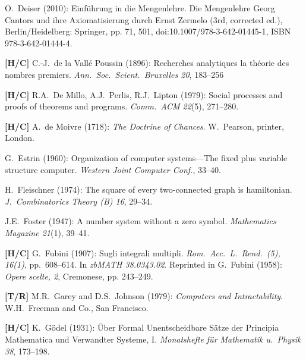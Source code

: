 \begin{thebibliography}{999}
O.~Deiser (2010): Einf\"{u}hrung in die Mengenlehre.  Die Mengenlehre Georg Cantors und ihre Axiomatisierung durch Ernst Zermelo (3rd, corrected ed.), Berlin/Heidelberg: Springer, pp. 71, 501, doi:10.1007/978-3-642-01445-1, ISBN 978-3-642-01444-4.

{\bf [H/C]}
C.-J.~de la Vall\'{e} Poussin (1896): Recherches analytiques la th\'{e}orie des nombres premiers.
{\it Ann.~Soc.~Scient.~Bruxelles 20}, 183--256

{\bf [H/C]}
R.A.~De Millo, A.J.~Perlis, R.J.~Lipton (1979): Social processes and proofs of theorems and programs.  {\it Comm.~ACM 22}(5), 271--280.

{\bf [H/C]}
A.~de Moivre (1718): {\it The Doctrine of Chances}.  W.~Pearson, printer, London.



G.~Estrin (1960): Organization of computer systems---The fixed plus variable structure computer.
{\it Western Joint Computer Conf.}, 33--40.




H.~Fleischner (1974):  The square of every two-connected graph is hamiltonian.
{\it J.~Combinatorics Theory (B) 16}, 29--34.

J.E.~Foster (1947): A number system without a zero symbol.  {\it Mathematics Magazine 21}(1), 39--41.

{\bf [H/C]}
G.~Fubini (1907): Sugli integrali multipli.
{\it Rom.~Acc.~L.~Rend.~(5), 16(1)}, pp.~608--614.  In {\it zbMATH 38.0343.02}.  Reprinted in G.~Fubini (1958): {\it Opere scelte, 2}, Cremonese, pp. 243--249.



{\bf [T/R]}
M.R.~Garey and D.S.~Johnson (1979): {\it Computers and Intractability}.  W.H.~Freeman and Co., San Francisco.

{\bf [H/C]}
K.~G\"{o}del (1931): \"{U}ber Formal Unentscheidbare S\"{a}tze der Principia Mathematica und Verwandter Systeme, I.  {\it Monatshefte f\"{u}r Mathematik u.~Physik 38}, 173--198.



\end{thebibliography}
